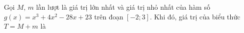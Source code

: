\begin{ex}
Gọi $M$, $m$ lần lượt là giá trị lớn nhất và giá trị nhỏ nhất của hàm số $g(x)=x^3+4x^2-28x+23$ trên đoạn $[-2;3]$. Khi đó, giá trị của biểu thức $T=M+m$ là
\end{ex}
